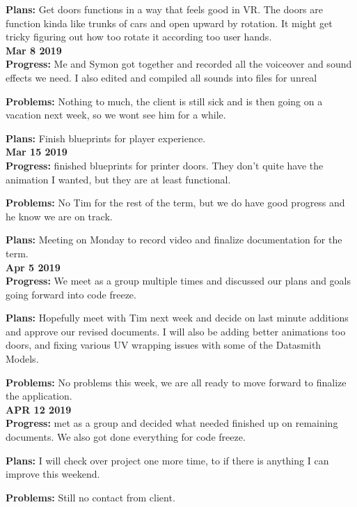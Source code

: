 \textbf{Plans:}
Get doors functions in a way that feels good in VR. The doors are function kinda like trunks of cars and open upward by rotation. It might get tricky figuring out how too rotate it according too user hands.\\

\textbf{Mar 8 2019}\\
\textbf{Progress:} 
Me and Symon got together and recorded all the voiceover and sound effects we need. I also edited and compiled all sounds into files for unreal

\textbf{Problems:}
Nothing to much, the client is still sick and is then going on a vacation next week, so we wont see him for a while.

\textbf{Plans:} 
Finish blueprints for player experience. \\

\textbf{Mar 15 2019}\\
\textbf{Progress:}
finished blueprints for printer doors. They don't quite have the animation I wanted, but they are at least functional.

\textbf{Problems:} 
No Tim for the rest of the term, but we do have good progress and he know we are on track.

\textbf{Plans:} 
Meeting on Monday to record video and finalize documentation for the term.\\

\textbf{Apr 5 2019}\\
\textbf{Progress:} 
We meet as a group multiple times and discussed our plans and goals going forward into code freeze.

\textbf{Plans:} 
Hopefully meet with Tim next week and decide on last minute additions and approve our revised documents. I will also be adding better animations too doors, and fixing various UV wrapping issues with some of the Datasmith Models.

\textbf{Problems:} 
No problems this week, we are all ready to move forward to finalize the application.\\

\textbf{APR 12 2019}\\
\textbf{Progress:} 
met as a group and decided what needed finished up on remaining documents. We also got done everything for code freeze.

\textbf{Plans:} 
I will check over project one more time, to if there is anything I can improve this weekend.

\textbf{Problems:} 
Still no contact from client.\\

